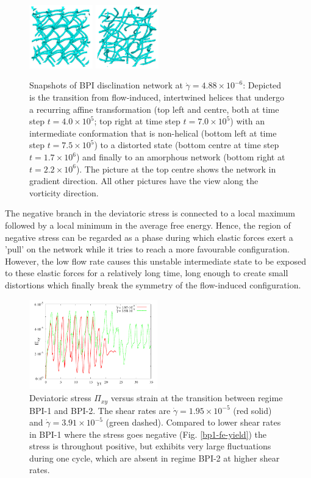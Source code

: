\documentclass[aps,pre,reprint,superscriptaddress, twocolumn]{revtex4}
\newcommand{\e}[1]{\times10^{#1}}
\newcommand{\gd}{\dot{\gamma}}
\begin{document}
\begin{figure}[htpb]
\includegraphics[width=0.245\textwidth]{disc-xy-750k_run1115.png}
\includegraphics[width=0.245\textwidth]{disc-xy-2200k_run1115.png}
\caption{Snapshots of BPI disclination network at $\dot{\gamma}=4.88\e{-6}$: 
Depicted is the transition from flow-induced, intertwined helices that 
undergo a recurring affine transformation (top left and centre, both at 
time step $t=4.0\e{5}$; top right at time step $t=7.0\e{5}$) with an intermediate 
conformation that is non-helical (bottom left at time step $t=7.5\e{5}$) 
to a distorted state (bottom centre at time step $t=1.7\e{6}$) and 
finally to an amorphous network (bottom right at $t=2.2\e{6}$). 
The picture at the top centre shows the network in gradient direction.
All other pictures have the view along the vorticity direction.}
\label{bp1-low}
\end{figure}

The negative branch in the deviatoric stress is connected
to a local maximum followed by a local minimum in the average free energy.
Hence, the region of negative stress can be 
regarded as a phase during which elastic forces exert a 
'pull' on the network while it tries to reach a more 
favourable configuration. However, the low flow rate
causes this unstable intermediate state to be exposed to these
elastic forces for a relatively long time, long enough to 
create small distortions which finally break the symmetry of the
flow-induced configuration.

\begin{figure}[htpb]
\includegraphics[width=0.495\textwidth]{stress_bp1-1_bp1-2.pdf}
\caption{Deviatoric stress $\Pi_{xy}$ versus strain at the transition between regime
BPI-1 and BPI-2. The shear rates are $\gd=1.95\e{-5}$ (red solid) 
and $\gd=3.91\e{-5}$ (green dashed). Compared to lower shear rates in BPI-1 
where the stress goes negative (Fig. \ref{bp1-fe-yield}) the stress is 
throughout positive, but exhibits very large fluctuations during one cycle, 
which are absent in regime BPI-2 at higher shear rates.}
\label{bp1-1_bp1-2}
\end{figure}
\end{document}
